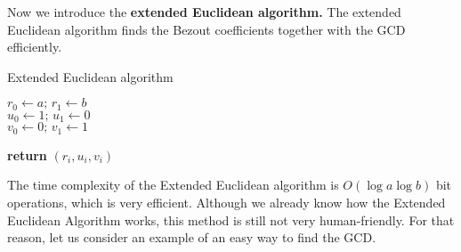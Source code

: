 \documentclass[../lecture-notes-148x210.tex]{subfiles}
\begin{document}
Now we introduce the \textbf{extended Euclidean algorithm.} The extended
Euclidean algorithm finds the Bezout coefficients together with the GCD
efficiently.

\begin{algorithm}[H]
    \caption{Extended Euclidean algorithm} \label{alg:extended_euclidean}
        
    $r_{0} \gets a; \, r_{1} \gets b$ \\
    $u_{0} \gets 1; \, u_{1} \gets 0$ \\
    $v_{0} \gets 0; \, v_{1} \gets 1$ \\


    \textbf{return} $(r_i, u_i, v_i)$
\end{algorithm}

The time complexity of the Extended Euclidean algorithm is $O(\log{a} \log{b})$ bit
operations, which is very efficient. Although we already know how the
Extended Euclidean Algorithm works, this method is still not very
human-friendly. For that reason, let us consider an example of an easy way to
find the GCD.
\end{document}
